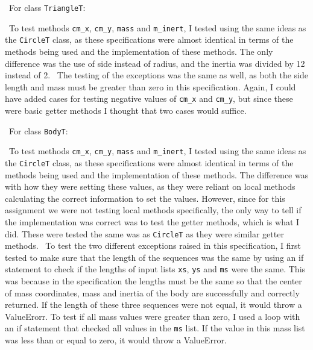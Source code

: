 \documentclass[12pt]{article}
\begin{document}
~\newline\noindent For class \verb|TriangleT|:

~\newline\noindent To test methods \verb|cm_x|, \verb|cm_y|, \verb|mass| and \verb|m_inert|, I tested using the same ideas as the \verb|CircleT| class, as these specifications were almost identical in terms of the methods being used and the implementation of these methods. The only difference was the use of side instead of radius, and the inertia was divided by 12 instead of 2.
~\newline\noindent The testing of the exceptions was the same as well, as both the side length and mass must be greater than zero in this specification. 
Again, I could have added cases for testing negative values of \verb|cm_x| and \verb|cm_y|, but since these were basic getter methods I thought that two cases would suffice. 

~\newline\noindent For class \verb|BodyT|:

~\newline\noindent To test methods \verb|cm_x|, \verb|cm_y|, \verb|mass| and \verb|m_inert|, I tested using the same ideas as the \verb|CircleT| class, as these specifications were almost identical in terms of the methods being used and the implementation of these methods. The difference was with how they were setting these values, as they were reliant on local methods calculating the correct information to set the values. However, since for this assignment we were not testing local methods specifically, the only way to tell if the implementation was correct was to test the getter methods, which is what I did. These were tested the same was as \verb|CircleT| as they were similar getter methods. 
~\newline\noindent To test the two different exceptions raised in this specification, I first tested to make sure that the length of the sequences was the same by using an if statement to check if the lengths of input lists \verb|xs|, \verb|ys| and \verb|ms| were the same. This was because in the specification the lengths must be the same so that the center of mass coordinates, mass and inertia of the body are successfully and correctly returned. If the length of these three sequences were not equal, it would throw a ValueErorr. 
To test if all mass values were greater than zero, I used a loop with an if statement that checked all values in the \verb|ms| list. If the value in this mass list was less than or equal to zero, it would throw a ValueError. 
\end{document}
